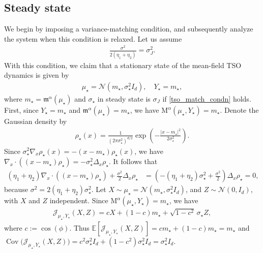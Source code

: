 \documentclass{article}
\numberwithin{equation}{section}
\begin{document}
\subsection{Steady state} \label{tso_steady_state_Sec}
We begin by imposing a variance-matching condition, and subsequently analyze the system when this condition is relaxed. Let us assume 
\begin{align}\label{tso_match_condn}
 \frac{\sigma^2}{2(\eta_1 + \eta_2)} = \sigma_J^2 .
\end{align} 
 With this condition, we claim that a stationary state of the mean-field TSO dynamics is given by
\begin{align}
    \mu_\star
    =  \mathcal{N}(m_\star,\sigma_\star^2 I_d),\quad 
    Y_\star
    = m_\star,
\end{align}
where $m_\star =     \mathfrak{m}^\alpha(\mu_\star)$ and $\sigma_\star $ in steady state is $\sigma_J$ if \eqref{tso_match_condn} holds.  First, since $Y_\star=m_\star$
 and $\mathfrak{m}^\alpha(\mu_\star)=m_\star$, we have $\mathrm{M}^\alpha(\mu_\star,Y_\star)  =     m_\star$. 
 Denote the Gaussian density by
 \begin{align}
    \rho_\star(x)
    =
    \frac{1}{(2\pi\sigma_\star^2)^{d/2}}
    \exp\left(
    -\frac{|x-m_\star|^2}{2\sigma_\star^2}
    \right).
\end{align}
Since $\sigma_\star^2 \nabla_x\rho_\star(x) = -(x- m_\star)\rho_\star(x)$, we have $\nabla_x\cdot((x-m_\star)\rho_\star)
= -\sigma_\star^2\Delta_x\rho_\star$. It follows that
\begin{align}
(\eta_1 + \eta_2)\nabla_x\cdot(
(x- m_\star)\rho_\star) +
\frac{\sigma^2}{2}\Delta_x\rho_\star
&= \left(
-(\eta_1 + \eta_2)\sigma_\star^2+\frac{\sigma^2}{2}
\right)
\Delta_x\rho_\star = 0, \label{tso_eqn_2.21}
\end{align}
because $\sigma^2=2(\eta_1 + \eta_2)\sigma_\star^2$.  Let $    X\sim \mu_\star=\mathcal N(m_\star,\sigma_\star^2I_d)$, and $Z\sim \mathcal{N}(0,I_d)$, 
with $X$ and $Z$ independent. Since $\mathrm{M}^\alpha(\mu_\star,Y_\star)=m_\star$, we have
\begin{align}
    \mathcal J_{\mu_\star,Y_\star}(X,Z) =
    cX+(1-c)m_\star +
    \sqrt{1-c^2}\,\sigma_\star Z,
\end{align}
where $c:= \cos(\phi)$. Thus $\mathbb E[\mathcal J_{\mu_\star,Y_\star}(X,Z)] =
    cm_\star+(1-c)m_\star  = m_\star$ and $   \operatorname{Cov}
    \bigl( \mathcal J_{\mu_\star,Y_\star}(X,Z)\bigr)=     c^2\sigma_\star^2I_d +     (1-c^2)\sigma_\star^2I_d =     \sigma_\star^2I_d$. 
\end{document}
